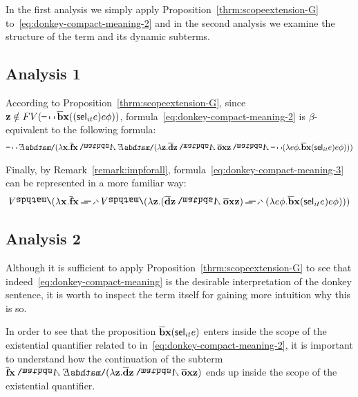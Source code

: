 In the first analysis we simply apply Proposition~\ref{thrm:scopeextension-G} to~\eqref{eq:donkey-compact-meaning-2} and in the second analysis we examine the structure of the term and its dynamic subterms. %

\subsection*{Analysis 1}


According to Proposition~\ref{thrm:scopeextension-G}, since $\z2 \notin FV(\n2 \tr{\cbeat}  \x2 (( \selK_{it} e ) e \phi))$, formula~\eqref{eq:donkey-compact-meaning-2} is $\beta$-equivalent to the following formula:
\begin{align}
\n2 \ex2 (\lambda \x2.  \tr{\cfarmer}  \x2 \cnj2   \ex2 (\lambda \z2.  \tr{\cdonkey}  \z2 \cnj2 \tr{\cown}  \x2 \z2    \cnj2  \n2  ( \lambda e \phi. \tr{\cbeat}  \x2 ( \selK_{it} e ) e \phi ) )) \label{eq:donkey-compact-meaning-3}
\end{align}

Finally, by Remark~\eqref{remark:impforall}, formula~\eqref{eq:donkey-compact-meaning-3} can be represented in a more familiar way:
\begin{align}
 \all2 (\lambda \x2.  \tr{\cfarmer}  \x2 \impK2   \all2 (\lambda \z2. ( \tr{\cdonkey}  \z2 \cnj2 \tr{\cown}  \x2 \z2 )   \impK2    ( \lambda e \phi. \tr{\cbeat}  \x2 ( \selK_{it} e ) e \phi ) )) 
 \label{eq:donkey-compact-meaning-4}
\end{align}


\subsection*{Analysis 2}


Although it is sufficient to apply Proposition~\ref{thrm:scopeextension-G} to see that indeed~\eqref{eq:donkey-compact-meaning} is the desirable interpretation of the donkey sentence, it is worth to inspect the term itself for gaining more intuition why this is so.

In order to see that the proposition $\tr{\cbeat}  \x2 ( \selK_{it} e )$ enters inside the scope of the existential quantifier related to  in~\eqref{eq:donkey-compact-meaning-2}, it is important to understand how the continuation of the subterm $\tr{\cfarmer}  \x2 \cnj2 \ex2 (\lambda \z2.  \tr{\cdonkey}  \z2 \cnj2 \tr{\cown}  \x2 \z2  )$ ends up inside the scope of the existential quantifier. 

